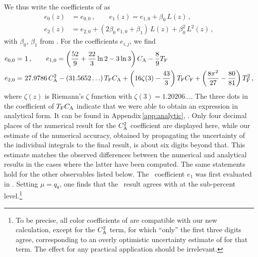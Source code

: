 We thus write the coefficients of  as
\begin{equation}
  \begin{split}
    e_0(z) &= e_{0,0}\,,\qquad
    e_1(z) = e_{1,0} + \beta_0\,L(z)\,,\\
    e_2(z) &= e_{2,0} + (2\beta_0\,e_{1,0}+\beta_1)\,L(z) +
    \beta_0^2\,L^2(z)\,,
    \label{eq:efull}
  \end{split}
\end{equation}
with $\beta_0$, $\beta_1$ from .  For the coefficients
$e_{i,j}$, we find
\begin{equation}
  \begin{split}
    e_{0,0} =&\ 1\,,\qquad
    e_{1,0} = \left(\frac{52}{9} + \frac{22}{3} \ln 2 - 3 \ln 3\right)
    C_\mathrm{A} - \frac{8}{9} T_\mathrm{F}\\
    e_{2,0} =&\ 27.9786\, C_\mathrm{A}^2  - (31.5652\ldots)\, T_\mathrm{F}C_\mathrm{A}
    + \left(16 \zeta(3) - \frac{43}{3}\right)
    T_\mathrm{F}C_\mathrm{F} + \left(\frac{8\pi^2}{27} -
    \frac{80}{81}\right) T_\mathrm{F}^2\,,
    \label{eq:econst}
  \end{split}
\end{equation}
where $\zeta(z)$ is Riemann's $\zeta$ function with $\zeta(3) =
1.20206\ldots$. The three dots in the coefficient of $T_\mathrm{F}C_\mathrm{A}$ indicate
that we were able to obtain an expression in analytical form. It can be
found in Appendix\,\ref{app:analytic}, .  Only four
decimal places of the numerical result for the $C_\mathrm{A}^2$ coefficient are
displayed here, while our estimate of the numerical accuracy, obtained by
propagating the uncertainty of the individual integrals to the final
result, is about six digits beyond that. This estimate matches the
observed differences between the numerical and analytical results in the
cases where the latter have been computed.  The same statements hold for
the other observables listed below.  The \nlo\ coefficient $e_1$ was
first evaluated in .  Setting $\mu=q_8$, one
finds that the \nnlo\ result agrees with  at the
sub-percent level.\footnote{To be precise, all color coefficients of
   are compatible with our new calculation,
  except for the $C_\mathrm{A}^2$ term, for which ``only'' the first three digits
  agree, corresponding to an overly optimistic uncertainty estimate of
   for that term. The effect for any practical
  application should be irrelevant.}

